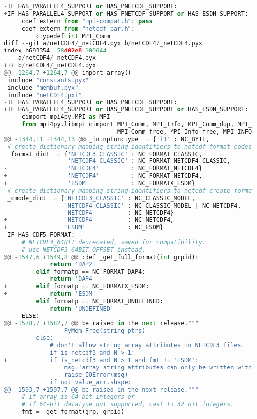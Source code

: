 \begin{lstlisting}[language=python,upquote=true]
-IF HAS_PARALLEL4_SUPPORT or HAS_PNETCDF_SUPPORT:
+IF HAS_PARALLEL4_SUPPORT or HAS_PNETCDF_SUPPORT or HAS_ESDM_SUPPORT:
     cdef extern from "mpi-compat.h": pass
     cdef extern from "netcdf_par.h":
         ctypedef int MPI_Comm
diff --git a/netCDF4/_netCDF4.pyx b/netCDF4/_netCDF4.pyx
index b693354..58d02e8 100644
--- a/netCDF4/_netCDF4.pyx
+++ b/netCDF4/_netCDF4.pyx
@@ -1264,7 +1264,7 @@ import_array()
 include "constants.pyx"
 include "membuf.pyx"
 include "netCDF4.pxi"
-IF HAS_PARALLEL4_SUPPORT or HAS_PNETCDF_SUPPORT:
+IF HAS_PARALLEL4_SUPPORT or HAS_PNETCDF_SUPPORT or HAS_ESDM_SUPPORT:
     cimport mpi4py.MPI as MPI
     from mpi4py.libmpi cimport MPI_Comm, MPI_Info, MPI_Comm_dup, MPI_Info_dup, \
                                MPI_Comm_free, MPI_Info_free, MPI_INFO_NULL,\
@@ -1344,11 +1344,13 @@ _intnptonctype  = {'i1' : NC_BYTE,
 # create dictionary mapping string identifiers to netcdf format codes
 _format_dict  = {'NETCDF3_CLASSIC' : NC_FORMAT_CLASSIC,
                  'NETCDF4_CLASSIC' : NC_FORMAT_NETCDF4_CLASSIC,
-                 'NETCDF4'         : NC_FORMAT_NETCDF4}
+                 'NETCDF4'         : NC_FORMAT_NETCDF4,
+                 'ESDM'            : NC_FORMATX_ESDM}
 # create dictionary mapping string identifiers to netcdf create format codes
 _cmode_dict  = {'NETCDF3_CLASSIC' : NC_CLASSIC_MODEL,
                 'NETCDF4_CLASSIC' : NC_CLASSIC_MODEL | NC_NETCDF4,
-                'NETCDF4'         : NC_NETCDF4}
+                'NETCDF4'         : NC_NETCDF4,
+                'ESDM'            : NC_ESDM}
 IF HAS_CDF5_FORMAT:
     # NETCDF3_64BIT deprecated, saved for compatibility.
     # use NETCDF3_64BIT_OFFSET instead.
@@ -1547,6 +1549,8 @@ cdef _get_full_format(int grpid):
             return 'DAP2'
         elif formatp == NC_FORMAT_DAP4:
             return 'DAP4'
+        elif formatp == NC_FORMATX_ESDM:
+            return 'ESDM'
         elif formatp == NC_FORMAT_UNDEFINED:
             return 'UNDEFINED'
     ELSE:
@@ -1578,7 +1582,7 @@ be raised in the next release."""
                 PyMem_Free(string_ptrs)
         else:
             # don't allow string array attributes in NETCDF3 files.
-            if is_netcdf3 and N > 1:
+            if is_netcdf3 and N > 1 and fmt != 'ESDM':
                 msg='array string attributes can only be written with NETCDF4'
                 raise IOError(msg)
             if not value_arr.shape:
@@ -1593,7 +1597,7 @@ be raised in the next release."""
     # if array is 64 bit integers or
     # if 64-bit datatype not supported, cast to 32 bit integers.
     fmt = _get_format(grp._grpid)

\end{lstlisting}
